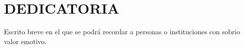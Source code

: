 \section*{DEDICATORIA}
\justifying
Escrito breve en el que se podrá recordar a personas o instituciones con sobrio valor emotivo.